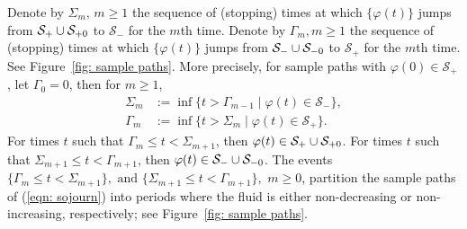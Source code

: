 Denote by \(\Sigma_m,\, m\geq 1\) the sequence of (stopping) times at which \(\{\varphi(t)\}\) jumps from \(\mathcal S_+\cup\mathcal{S}_{+0}\) to \(\mathcal S_- \) for the \(m\)th time. Denote by \(\Gamma_m, m\geq 1\) the sequence of (stopping) times at which \(\{\varphi(t)\}\) jumps from \(\mathcal S_-\cup\mathcal{S}_{-0}\) to \(\mathcal S_+\) for the \(m\)th time. See Figure~\ref{fig: sample paths}. More precisely, for sample paths with \(\varphi(0)\in\mathcal S_+\), let \(\Gamma_0=0\), then for \(m\geq 1\), 
\begin{align}
	\Sigma_m &:=\inf\{t > \Gamma_{m-1} \mid \varphi(t)\in\mathcal S_-\}, 
	\\ \Gamma_m &:=\inf\{t > \Sigma_{m} \mid \varphi(t)\in\mathcal S_+\}.
\end{align}
For times \(t\) such that \(\Gamma_m\leq t<\Sigma_{m+1}\), then \(\varphi(t)\in\mathcal S_+\cup\mathcal{S}_{+0}\). For times \(t\) such that \(\Sigma_{m+1}\leq t< \Gamma_{m+1}\), then \(\varphi(t)\in\mathcal S_-\cup\mathcal{S}_{-0}\). The events \(\{\Gamma_m\leq t< \Sigma_{m+1}\} , \mbox{ and } \{\Sigma_{m+1}\leq t< \Gamma_{m+1}\}, \) \(m\geq 0\), partition the sample paths of (\ref{eqn: sojourn}) into periods where the fluid is either non-decreasing or non-increasing, respectively; see Figure~\ref{fig: sample paths}.

